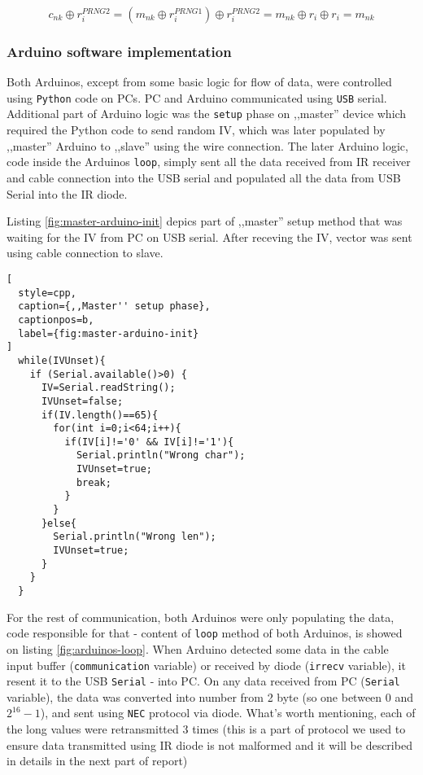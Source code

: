 \begin{equation} \label{eq:7} c_{nk} \oplus r_{i}^{PRNG2} = (m_{nk} \oplus r_{i}^{PRNG1}) \oplus r_{i}^{PRNG2} = m_{nk} \oplus r_{i} \oplus r_{i} = m_{nk}\end{equation}

\subsubsection{Arduino software implementation}
Both Arduinos, except from some basic logic for flow of data, were controlled using \texttt{Python} code on PCs. PC and Arduino communicated using \texttt{USB} serial. Additional part of Arduino logic was the \texttt{setup} phase on 
,,master'' device which required the Python code to send random IV, which was later populated by ,,master'' Arduino to ,,slave'' using the wire connection. The later Arduino logic, code inside the Arduinos \texttt{loop}, simply sent all the data received from IR receiver and cable connection into the USB serial and populated all the data from USB Serial into the IR diode. 

Listing \ref{fig:master-arduino-init} depics part of ,,master'' setup method that was waiting for the IV from PC on USB serial. After receving the IV, vector was sent using cable connection to slave.

\begin{minipage}{\linewidth}
\begin{lstlisting}[
  style=cpp,
  caption={,,Master'' setup phase},
  captionpos=b,
  label={fig:master-arduino-init}
]
  while(IVUnset){
    if (Serial.available()>0) {
      IV=Serial.readString();
      IVUnset=false;
      if(IV.length()==65){
        for(int i=0;i<64;i++){
          if(IV[i]!='0' && IV[i]!='1'){
            Serial.println("Wrong char");
            IVUnset=true;
            break;
          }
        }
      }else{
        Serial.println("Wrong len");
        IVUnset=true;
      }
    }
  }
\end{lstlisting}
\end{minipage}

For the rest of communication, both Arduinos were only populating the data, code responsible for that - content of \texttt{loop} method of both Arduinos, is showed on listing \ref{fig:arduinos-loop}. When Arduino detected some data in the cable input buffer (\texttt{communication} variable) or received by diode (\texttt{irrecv} variable), it resent it to the USB \texttt{Serial} - into PC. On any data received from PC (\texttt{Serial} variable), the data was converted into number from 2 byte (so one between $0$ and $2^{16} - 1$), and sent using \texttt{NEC} protocol via diode. What's worth mentioning, each of the long values were retransmitted 3 times (this is a part of protocol we used to ensure data transmitted using IR diode is not malformed and it will be described in details in the next part of report)

